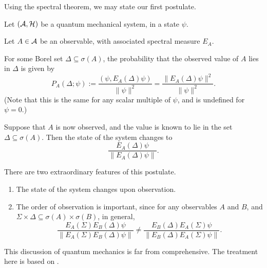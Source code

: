 Using the spectral theorem, we may state our first postulate.
\begin{postulate}
\label{pos1}
    Let $(\mathcal{A},\mathcal{H})$ be a quantum mechanical system, in a state $\psi$. 
    
    Let $A \in \mathcal{A}$ be an observable, with associated spectral measure $E_A$. 
    
    For some Borel set $\Delta \subseteq \sigma(A)$, the probability 
    that the observed value of $A$ lies in $\Delta$ is given by
    \begin{equation*}
        P_A(\Delta;\psi) := \frac{(\psi,E_A(\Delta)\psi)}{\|\psi\|^2} = \frac{\|E_A(\Delta)\psi\|^2}{\|\psi\|^2}.
    \end{equation*}
    (Note that this is the same for any scalar multiple of $\psi$, and is undefined
    for $\psi = 0$.)
    
    Suppose that $A$ is now observed, and the value is known to lie
    in the set $\Delta \subseteq \sigma(A)$. Then the state
    of the system changes to
    \begin{equation*}
        \frac{E_A(\Delta)\psi}{\|E_A(\Delta)\psi\|}.
    \end{equation*}
\end{postulate}

\begin{remark}
    There are two extraordinary features of this postulate.
    \begin{enumerate}
        \item{} The state of the system changes upon observation.
        \item{} The order of observation is important, since
        for any observables $A$ and $B$, and $\Sigma \times \Delta \subseteq \sigma(A)\times\sigma(B)$, 
        in general,
        \begin{equation*}
            \frac{E_A(\Sigma)E_B(\Delta)\psi}{\|E_A(\Sigma)E_B(\Delta)\psi\|} \neq \frac{E_B(\Delta)E_A(\Sigma)\psi}{\|E_B(\Delta)E_A(\Sigma)\psi\|}.
        \end{equation*}
    \end{enumerate}
\end{remark}

\begin{remark}
    This discussion of quantum mechanics is far from comprehensive. The 
    treatment here is based on \cite{QM1}.
\end{remark}


